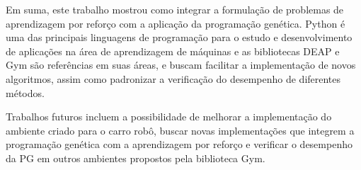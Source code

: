 Em suma, este trabalho mostrou como integrar a formulação de problemas de aprendizagem por reforço com a aplicação da programação genética. Python é uma das principais linguagens de programação para o estudo e desenvolvimento de aplicações na área de aprendizagem de máquinas e as bibliotecas DEAP e Gym são referências em suas áreas, e buscam facilitar a implementação de novos algoritmos, assim como padronizar a verificação do desempenho de diferentes métodos.

Trabalhos futuros incluem a possibilidade de melhorar a implementação do ambiente criado para o carro robô, buscar novas implementações que integrem a programação genética com a aprendizagem por reforço e verificar o desempenho da PG em outros ambientes propostos pela biblioteca Gym.
